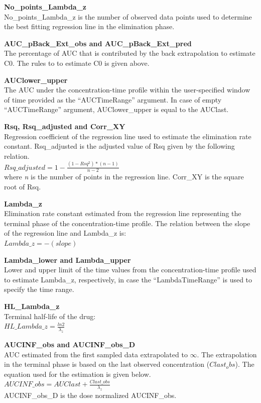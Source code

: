 \documentclass[
  10pt,
]{krantz}
\begin{document}
\textbf{No\_points\_Lambda\_z}\\
No\_points\_Lambda\_z is the number of observed data points used to determine the best fitting regression line in the elimination phase.

\textbf{AUC\_pBack\_Ext\_obs and AUC\_pBack\_Ext\_pred}\\
The percentage of AUC that is contributed by the back extrapolation to estimate C0. The rules to to estimate C0 is given above.

\textbf{AUClower\_upper}\\
The AUC under the concentration-time profile within the user-specified window of time provided as the ``AUCTimeRange'' argument. In case of empty ``AUCTimeRange'' argument, AUClower\_upper is equal to the AUClast.

\textbf{Rsq, Rsq\_adjusted and Corr\_XY}\\
Regression coefficient of the regression line used to estimate the elimination rate constant. Rsq\_adjusted is the adjusted value of Rsq given by the following relation.\\
\(Rsq\_adjusted = 1-\frac{(1-Rsq^2)*(n-1)}{n-2}\)\\
where \emph{n} is the number of points in the regression line. Corr\_XY is the square root of Rsq.

\textbf{Lambda\_z}\\
Elimination rate constant estimated from the regression line representing the terminal phase of the concentration-time profile. The relation between the slope of the regression line and Lambda\_z is:\\
\(Lambda\_z = -(slope)\)

\textbf{Lambda\_lower and Lambda\_upper}\\
Lower and upper limit of the time values from the concentration-time profile used to estimate Lambda\_z, respectively, in case the ``LambdaTimeRange'' is used to specify the time range.

\textbf{HL\_Lambda\_z}\\
Terminal half-life of the drug:\\
\(HL\_Lambda\_z = \frac{ln2}{\lambda_z}\)

\textbf{AUCINF\_obs and AUCINF\_obs\_D}\\
AUC estimated from the first sampled data extrapolated to \({\infty}\). The extrapolation in the terminal phase is based on the last observed concentration (\({Clast_obs}\)). The equation used for the estimation is given below.\\
\(AUCINF\_obs = AUClast+\frac{Clast\_obs}{\lambda_z}\)\\
AUCINF\_obs\_D is the dose normalized AUCINF\_obs.
\end{document}
